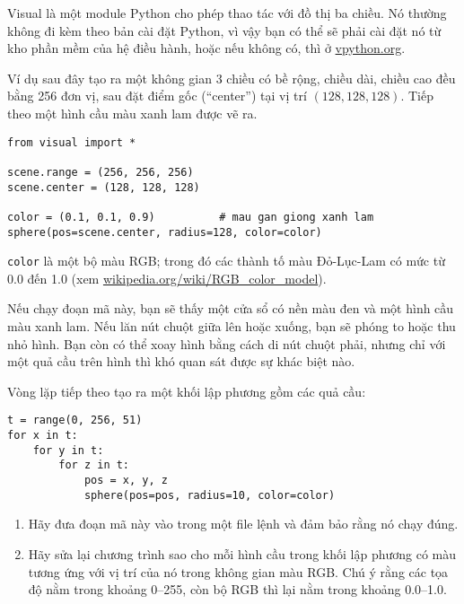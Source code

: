 \documentclass[11pt]{book}
\begin{document}
\begin{ex}


Visual là một module Python cho phép thao tác với đồ thị ba chiều. Nó 
thường không đi kèm theo bản cài đặt Python, vì vậy bạn có thể sẽ
phải cài đặt nó từ kho phần mềm của hệ điều hành, hoặc nếu 
không có, thì ở  \url{vpython.org}.

Ví dụ sau đây tạo ra một không gian 3 chiều có bề rộng, chiều dài,
chiều cao đều bằng 256 đơn vị, sau đặt điểm gốc (``center'') tại
vị trí  $(128, 128, 128)$. Tiếp theo một hình cầu màu xanh lam được vẽ ra.

\beforeverb
\begin{verbatim}
from visual import *

scene.range = (256, 256, 256)
scene.center = (128, 128, 128)

color = (0.1, 0.1, 0.9)          # mau gan giong xanh lam
sphere(pos=scene.center, radius=128, color=color)
\end{verbatim}
\afterverb

{\tt color} là một bộ màu RGB; trong đó các thành tố màu Đỏ-Lục-Lam
có mức từ 0.0 đến 1.0 (xem
\url{wikipedia.org/wiki/RGB_color_model}).

Nếu chạy đoạn mã này, bạn sẽ thấy một cửa sổ có nền màu đen và
một hình cầu màu xanh lam. Nếu lăn nút chuột giữa lên hoặc xuống,
bạn sẽ phóng to hoặc thu nhỏ hình. Bạn còn có thể xoay hình bằng
cách di nút chuột phải, nhưng chỉ với một quả cầu trên hình thì
khó quan sát được sự khác biệt nào. 

Vòng lặp tiếp theo tạo ra một khối lập phương gồm các quả cầu:

\beforeverb
\begin{verbatim}
t = range(0, 256, 51)
for x in t:
    for y in t:
        for z in t:
            pos = x, y, z
            sphere(pos=pos, radius=10, color=color)
\end{verbatim}
\afterverb

\begin{enumerate}

\item Hãy đưa đoạn mã này vào trong một file lệnh và đảm bảo rằng
nó chạy đúng.

\item Hãy sửa lại chương trình sao cho mỗi hình cầu trong khối lập
phương có màu tương ứng với vị trí của nó trong không gian màu RGB.
Chú ý rằng các tọa độ nằm trong khoảng  0--255, còn
bộ RGB thì lại nằm trong khoảng 0.0--1.0.


\end{enumerate}
\end{ex}
\end{document}
